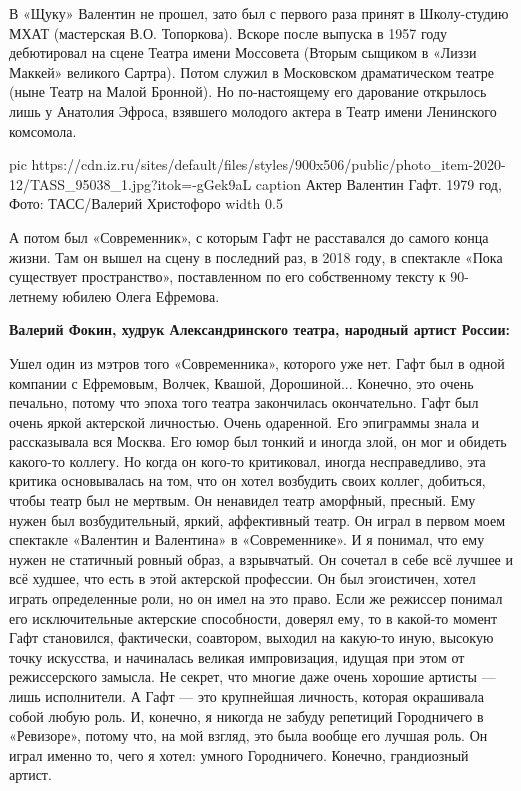 В «Щуку» Валентин не прошел, зато был с первого раза принят в Школу-студию МХАТ
(мастерская В.О. Топоркова). Вскоре после выпуска в 1957 году дебютировал на
сцене Театра имени Моссовета (Вторым сыщиком в «Лиззи Маккей» великого Сартра).
Потом служил в Московском драматическом театре (ныне Театр на Малой Бронной).
Но по-настоящему его дарование открылось лишь у Анатолия Эфроса, взявшего
молодого актера в Театр имени Ленинского комсомола. 

\ifcmt
  pic https://cdn.iz.ru/sites/default/files/styles/900x506/public/photo_item-2020-12/TASS_95038_1.jpg?itok=-gGek9aL
  caption Актер Валентин Гафт. 1979 год, Фото: ТАСС/Валерий Христофоро
  width 0.5
\fi

А потом был «Современник», с которым Гафт не расставался до самого конца жизни.
Там он вышел на сцену в последний раз, в 2018 году, в спектакле «Пока
существует пространство», поставленном по его собственному тексту к 90-летнему
юбилею Олега Ефремова.

\textbf{Валерий Фокин, худрук Александринского театра, народный артист России:}

\begingroup
\styleMP
Ушел один из мэтров того «Современника», которого уже нет. Гафт был в одной
компании с Ефремовым, Волчек, Квашой, Дорошиной... Конечно, это очень печально,
потому что эпоха того театра закончилась окончательно. Гафт был очень яркой
актерской личностью. Очень одаренной. Его эпиграммы знала и рассказывала вся
Москва. Его юмор был тонкий и иногда злой, он мог и обидеть какого-то коллегу.
Но когда он кого-то критиковал, иногда несправедливо, эта критика основывалась
на том, что он хотел возбудить своих коллег, добиться, чтобы театр был не
мертвым. Он ненавидел театр аморфный, пресный. Ему нужен был возбудительный,
яркий, аффективный театр. Он играл в первом моем спектакле «Валентин и
Валентина» в «Современнике». И я понимал, что ему нужен не статичный ровный
образ, а взрывчатый. Он сочетал в себе всё лучшее и всё худшее, что есть в этой
актерской профессии. Он был эгоистичен, хотел играть определенные роли, но он
имел на это право. Если же режиссер понимал его исключительные актерские
способности, доверял ему, то в какой-то момент Гафт становился, фактически,
соавтором, выходил на какую-то иную, высокую точку искусства, и начиналась
великая импровизация, идущая при этом от режиссерского замысла. Не секрет, что
многие даже очень хорошие артисты — лишь исполнители. А Гафт — это крупнейшая
личность, которая окрашивала собой любую роль. И, конечно, я никогда не забуду
репетиций Городничего в «Ревизоре», потому что, на мой взгляд, это была вообще
его лучшая роль. Он играл именно то, чего я хотел: умного Городничего. Конечно,
грандиозный артист.
	
